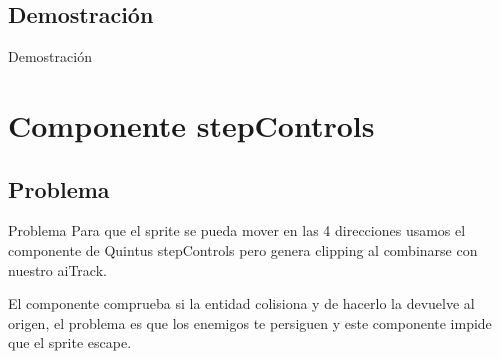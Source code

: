 \documentclass{beamer}
\begin{document}
\subsection{Demostración}
\begin{frame}{Demostración}
  \centering
\end{frame}

\section{Componente stepControls}

\subsection{Problema}

\begin{frame}{Problema}
Para que el sprite se pueda mover en las 4 direcciones usamos el componente
de Quintus stepControls pero genera clipping al combinarse con nuestro aiTrack.

\medskip

El componente comprueba si la entidad colisiona y de hacerlo la devuelve al
origen, el problema es que los enemigos te persiguen y este componente impide
que el sprite escape.
\end{frame}
\end{document}

